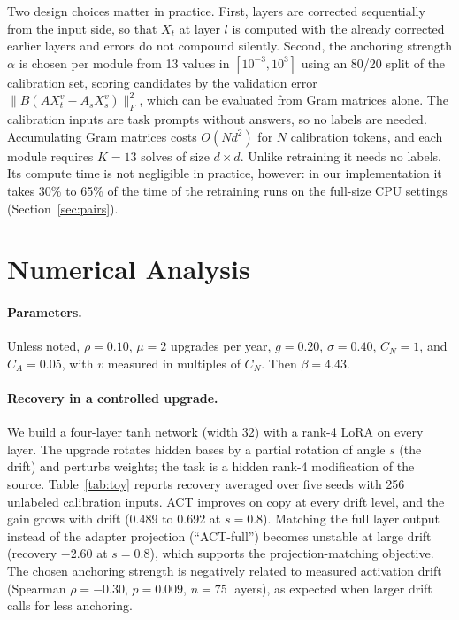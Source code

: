 \documentclass[acmsmall,review]{acmart}
\begin{document}
Two design choices matter in practice. First, layers are corrected sequentially from the input side, so that $X_t$ at
layer $l$ is computed with the already corrected earlier layers and errors do not compound silently. Second, the
anchoring strength $\alpha$ is chosen per module from 13 values in $[10^{-3},10^{3}]$ using an 80/20 split of the
calibration set, scoring candidates by the validation error $\|B(AX_t^{v}-A_sX_s^{v})\|_F^2$, which can be evaluated from
Gram matrices alone. The calibration inputs are task prompts without answers, so no labels are needed.
Accumulating Gram matrices costs $O(Nd^2)$ for $N$ calibration tokens, and each module requires $K=13$ solves of size
$d\times d$. Unlike retraining it needs no labels. Its compute time is not negligible in practice, however: in our
implementation it takes 30\% to 65\% of the time of the retraining runs on the full-size CPU settings (Section~\ref{sec:pairs}).

\section{Numerical Analysis}\label{sec:numerical}

\paragraph{Parameters.} Unless noted, $\rho=0.10$, $\mu=2$ upgrades per year, $g=0.20$, $\sigma=0.40$, $C_N=1$, and
$C_A=0.05$, with $v$ measured in multiples of $C_N$. Then $\beta=4.43$.

\paragraph{Recovery in a controlled upgrade.} We build a four-layer tanh network (width 32) with a rank-4 LoRA on
every layer. The upgrade rotates hidden bases by a partial rotation of angle $s$ (the drift) and perturbs weights; the
task is a hidden rank-4 modification of the source. Table~\ref{tab:toy} reports recovery averaged over five seeds
with 256 unlabeled calibration inputs. ACT improves on copy at every drift level, and the gain grows with drift
(0.489 to 0.692 at $s=0.8$). Matching the full layer output instead of the adapter projection (``ACT-full'') becomes
unstable at large drift (recovery $-2.60$ at $s=0.8$), which supports the projection-matching objective. The chosen
anchoring strength is negatively related to measured activation drift (Spearman $\rho=-0.30$, $p=0.009$,
$n=75$ layers), as expected when larger drift calls for less anchoring.
\end{document}
